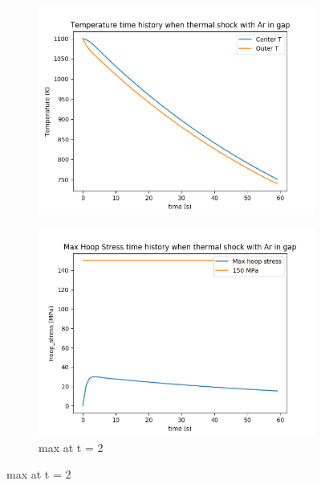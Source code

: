 \documentclass[12pt]{article}
\begin{document}
\begin{itemize}
\begin{figure}[h]
\begin{subfigure}[b]{0.4\textwidth}
        \caption{}
        \label{fig:tiger}
    \end{subfigure}
    ~ 
    \begin{subfigure}[b]{0.4\textwidth}
        \includegraphics[width=\textwidth]{thermalShock_Ar_T_vs_t.png}
        \caption{}
        \label{fig:t750}
    \end{subfigure}
        \begin{subfigure}[b]{0.4\textwidth}
        \includegraphics[width=\textwidth]{thermalShock_Ar_stress_vs_t.png}
        \caption{max at t = 2}
        \label{fig:t1000}
    \end{subfigure}
\end{figure}
\end{itemize}
 
\end{document}
